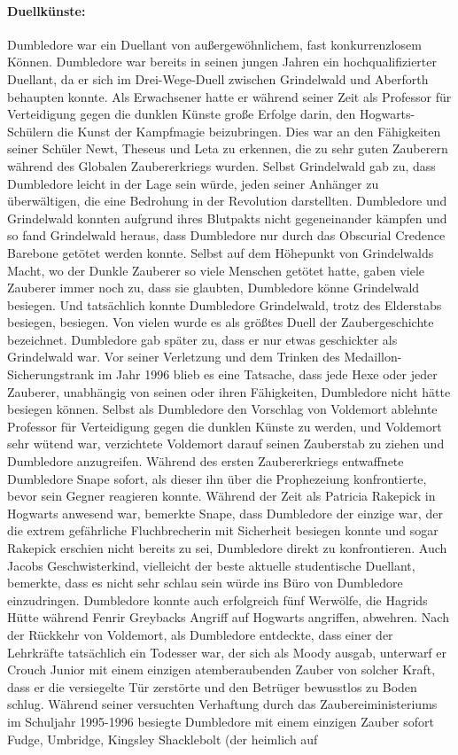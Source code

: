 \documentclass[a4paper, 10pt]{article}
\begin{document}
\paragraph{Duellkünste:}
Dumbledore war ein Duellant von außergewöhnlichem, fast konkurrenzlosem Können. Dumbledore war bereits in seinen jungen Jahren ein hochqualifizierter Duellant, da er sich im Drei-Wege-Duell zwischen Grindelwald und Aberforth behaupten konnte. Als Erwachsener hatte er während seiner Zeit als Professor für Verteidigung gegen die dunklen Künste große Erfolge darin, den Hogwarts-Schülern die Kunst der Kampfmagie beizubringen. Dies war an den Fähigkeiten seiner Schüler Newt, Theseus und Leta zu erkennen, die zu sehr guten Zauberern während des Globalen Zaubererkriegs wurden. Selbst Grindelwald gab zu, dass Dumbledore leicht in der Lage sein würde, jeden seiner Anhänger zu überwältigen, die eine Bedrohung in der Revolution darstellten. Dumbledore und Grindelwald konnten aufgrund ihres Blutpakts nicht gegeneinander kämpfen und so fand Grindelwald heraus, dass Dumbledore nur durch das Obscurial Credence Barebone getötet werden konnte. Selbst auf dem Höhepunkt von Grindelwalds Macht, wo der Dunkle Zauberer so viele Menschen getötet hatte, gaben viele Zauberer immer noch zu, dass sie glaubten, Dumbledore könne Grindelwald besiegen. Und tatsächlich konnte Dumbledore Grindelwald, trotz des Elderstabs besiegen, besiegen. Von vielen wurde es als größtes Duell der Zaubergeschichte bezeichnet. Dumbledore gab später zu, dass er nur etwas geschickter als Grindelwald war. Vor seiner Verletzung und dem Trinken des Medaillon-Sicherungstrank im Jahr 1996 blieb es eine Tatsache, dass jede Hexe oder jeder Zauberer, unabhängig von seinen oder ihren Fähigkeiten, Dumbledore nicht hätte besiegen können. Selbst als Dumbledore den Vorschlag von Voldemort ablehnte Professor für Verteidigung gegen die dunklen Künste zu werden, und Voldemort sehr wütend war, verzichtete Voldemort darauf seinen Zauberstab zu ziehen und Dumbledore anzugreifen. Während des ersten Zaubererkriegs entwaffnete Dumbledore Snape sofort, als dieser ihn über die Prophezeiung konfrontierte, bevor sein Gegner reagieren konnte. Während der Zeit als Patricia Rakepick in Hogwarts anwesend war, bemerkte Snape, dass Dumbledore der einzige war, der die extrem gefährliche Fluchbrecherin mit Sicherheit besiegen konnte und sogar Rakepick erschien nicht bereits zu sei, Dumbledore direkt zu konfrontieren. Auch Jacobs Geschwisterkind, vielleicht der beste aktuelle studentische Duellant, bemerkte, dass es nicht sehr schlau sein würde ins Büro von Dumbledore einzudringen. Dumbledore konnte auch erfolgreich fünf Werwölfe, die Hagrids Hütte während Fenrir Greybacks Angriff auf Hogwarts angriffen, abwehren. Nach der Rückkehr von Voldemort, als Dumbledore entdeckte, dass einer der Lehrkräfte tatsächlich ein Todesser war, der sich als Moody ausgab, unterwarf er Crouch Junior mit einem einzigen atemberaubenden Zauber von solcher Kraft, dass er die versiegelte Tür zerstörte und den Betrüger bewusstlos zu Boden schlug. Während seiner versuchten Verhaftung durch das Zaubereiministeriums im Schuljahr 1995-1996 besiegte Dumbledore mit einem einzigen Zauber sofort Fudge, Umbridge, Kingsley Shacklebolt (der heimlich auf 
\end{document}
